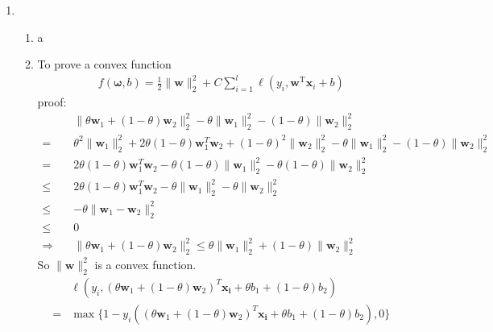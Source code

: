 \documentclass[a4paper]{article}
\begin{document}
\begin{enumerate}
\item 
\begin{enumerate}
  \item a
  \item To prove a convex function
  \begin{equation*}
    \begin{aligned}
      f(\boldsymbol{\omega} ,b) = \frac{1}{2}\|\boldsymbol{w}\|_{2}^{2}+C \sum_{i=1}^{l} \ell\left(y_{i}, \boldsymbol{w}^{\mathrm{T}} \boldsymbol{x}_{i}+b\right)
    \end{aligned}
  \end{equation*}
  proof:
  \begin{equation*}
    \begin{aligned}
      &\|\theta \boldsymbol{w}_{1}+(1-\theta) \boldsymbol{w}_{2}\|_{2}^{2} -\theta \| \boldsymbol{w}_{1}\|_{2}^{2}-(1-\theta) \|\boldsymbol{w}_{2}\|_{2}^{2}\\
      =& \theta^{2}\|\boldsymbol{w}_{1}\|_{2}^{2} + 2\theta(1-\theta)\boldsymbol{w}_{1}^{T} \boldsymbol{w}_{2}+ (1-\theta)^{2} \|\boldsymbol{w}_{2}\|_{2}^{2} -\theta \| \boldsymbol{w}_{1}\|_{2}^{2}-(1-\theta) \|\boldsymbol{w}_{2}\|_{2}^{2}\\
      =& 2\theta(1-\theta)\boldsymbol{w}_{1}^{T} \boldsymbol{w}_{2} - \theta(1-\theta)\|\boldsymbol{w}_{1}\|_{2}^{2} -\theta(1-\theta)\|\boldsymbol{w}_{2}\|_{2}^{2}\\
      \leq &2\theta(1-\theta)\boldsymbol{w}_{1}^{T} \boldsymbol{w}_{2} - \theta\|\boldsymbol{w}_{1}\|_{2}^{2} -\theta\|\boldsymbol{w}_{2}\|_{2}^{2}\\
      \leq &-\theta \|\boldsymbol{w}_{1} - \boldsymbol{w}_{2}\|_{2}^{2}\\
      \leq &0\\
      \Rightarrow \quad& \|\theta \boldsymbol{w}_{1}+(1-\theta) \boldsymbol{w}_{2}\|_{2}^{2}\leq \theta \| \boldsymbol{w}_{1}\|_{2}^{2} + (1-\theta) \| \boldsymbol{w}_{2}\|_{2}^{2}
    \end{aligned}
  \end{equation*}
  So $\|\boldsymbol{w}\|_{2}^{2}$ is a convex function.
  \begin{equation*}
    \begin{aligned}
      &\ell \left(y_i, (\theta \boldsymbol{w}_{1}+(1-\theta) \boldsymbol{w}_{2})^{T} \boldsymbol{x_i}+\theta b_{1}+(1-\theta) b_{2}\right)\\
      =& \max \{1-y_i \left((\theta \boldsymbol{w}_{1}+(1-\theta) \boldsymbol{w}_{2})^{T} \boldsymbol{x_i}+\theta b_{1}+(1-\theta) b_{2}\right), 0\}\\

\end{aligned}
\end{equation*}
\end{enumerate}
\end{enumerate}
\end{document}
